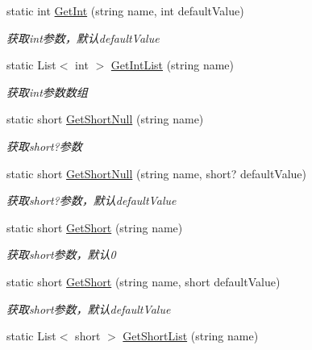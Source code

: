 \begin{DoxyCompactItemize}
static int \hyperlink{class_x_c_l_net_tools_1_1_string_hander_1_1_form_helper_ab1cbc4a5f6643c60beaf928081457b6f}{Get\+Int} (string name, int default\+Value)
\begin{DoxyCompactList}\small\item\em 获取int参数，默认default\+Value \end{DoxyCompactList}\item 
static List$<$ int $>$ \hyperlink{class_x_c_l_net_tools_1_1_string_hander_1_1_form_helper_a555eba05a8bdc2cab01e84b91e84f8c5}{Get\+Int\+List} (string name)
\begin{DoxyCompactList}\small\item\em 获取int参数数组 \end{DoxyCompactList}\item 
static short \hyperlink{class_x_c_l_net_tools_1_1_string_hander_1_1_form_helper_afe30b64436d0a1831330cd390f3f4b51}{Get\+Short\+Null} (string name)
\begin{DoxyCompactList}\small\item\em 获取short?参数 \end{DoxyCompactList}\item 
static short \hyperlink{class_x_c_l_net_tools_1_1_string_hander_1_1_form_helper_a742152e7ac8a4ea629b4434dd0ec4415}{Get\+Short\+Null} (string name, short? default\+Value)
\begin{DoxyCompactList}\small\item\em 获取short?参数，默认default\+Value \end{DoxyCompactList}\item 
static short \hyperlink{class_x_c_l_net_tools_1_1_string_hander_1_1_form_helper_a197c2283e3000030d40e7a50d10471f0}{Get\+Short} (string name)
\begin{DoxyCompactList}\small\item\em 获取short参数，默认0 \end{DoxyCompactList}\item 
static short \hyperlink{class_x_c_l_net_tools_1_1_string_hander_1_1_form_helper_a16b3f8a3141fb74656dc3c857da2099b}{Get\+Short} (string name, short default\+Value)
\begin{DoxyCompactList}\small\item\em 获取short参数，默认default\+Value \end{DoxyCompactList}\item 
static List$<$ short $>$ \hyperlink{class_x_c_l_net_tools_1_1_string_hander_1_1_form_helper_aa99502c5145f156f0e8b714d7ab4c308}{Get\+Short\+List} (string name)

\end{DoxyCompactItemize}
